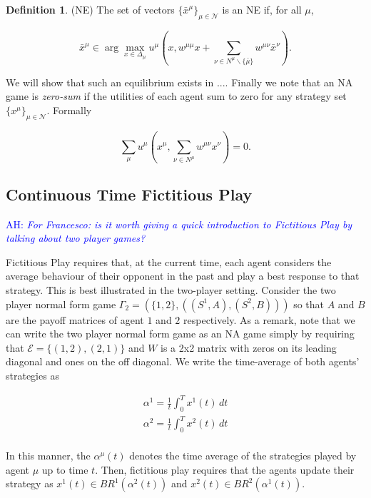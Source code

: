 \documentclass{article}
\theoremstyle{definition}
\newtheorem*{definition}{Definition}
\newcommand{\ah}[1]{\textcolor{blue}{AH: \textit{#1}}}
\newcommand{\agentset}{\mathcal{N}}
\newcommand{\edgeset}{\mathcal{E}}
\newcommand{\weightset}{W}
\newcommand{\wmunu}{w^{\mu \nu}}
\newcommand{\xmu}{x^{\mu}}
\newcommand{\xnu}{x^{\nu}}
\newcommand{\NE}[1]{\bar{x}^{#1}}
\newcommand{\weightedsum}{ \sum_{\nu \in N^\mu} \wmunu \xnu}
\begin{document}
	\begin{definition}(NE)
		The set of vectors $\{ \NE{\mu}\}_{\mu \in \agentset}$ is an NE if, for all $\mu$,
		
		\begin{equation*}
		\NE{\mu} \in \arg \max_{x \in \Delta_\mu} u^\mu(x, w^{\mu \mu} x + \sum_{\nu \in N^\mu \backslash \{\bar{\mu}\}} \wmunu \NE{\nu}).
		\end{equation*}
		
	\end{definition}

	We will show that such an equilibrium exists in .... Finally we note that an NA game is \emph{zero-sum} if the utilities of each agent sum to zero for any strategy set $\{ \xmu \}_{\mu \in \agentset}$. Formally

	\begin{equation}
		\sum_\mu u^\mu(\xmu, \weightedsum) = 0.
	\end{equation}

	\subsection{Continuous Time Fictitious Play}
	\label{sec::CTFP}

	\ah{For Francesco: is it worth giving a quick introduction to Fictitious Play by talking about two player games?}

	Fictitious Play requires that, at the current time, each agent considers the average behaviour
	of their opponent in the past and play a best response to that strategy. This is best
	illustrated in the two-player setting. Consider the two player normal form game $\Gamma_2 = (\{
	1, 2\}, ((S^1, A), (S^2, B)))$ so that $A$ and $B$ are the payoff matrices of agent $1$ and $2$
	respectively. As a remark, note that we can write the two player normal form game as an NA game
	simply by requiring that $\edgeset = \{(1, 2), (2, 1)\}$ and $\weightset$ is a 2x2 matrix with
	zeros on its leading diagonal and ones on the off diagonal. We write the time-average of both
	agents' strategies as 

	\begin{align}
		\alpha^1 = \frac{1}{t} \int_0^T x^1(t) \, dt \\
		\alpha^2 = \frac{1}{t} \int_0^T x^2(t) \, dt \\
	\end{align}

	In this manner, the $\alpha^\mu(t)$ denotes the time average of the strategies played by agent
	$\mu$ up to time $t$. Then, fictitious play requires that the agents update their strategy as
	$x^1(t) \in BR^1(\alpha^2(t))$ and $x^2(t) \in
	BR^2(\alpha^1(t))$. 
\end{document}
